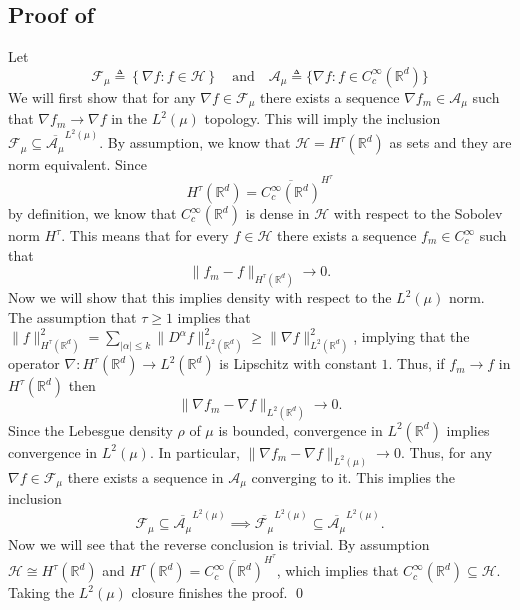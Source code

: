 \documentclass[11pt]{article}
\begin{document}
\subsection{Proof of } \label{sec: proof of suff cond for density}
Let 
\[\mathcal{F}_\mu \triangleq \left\{\nabla f : f \in \mathcal{H}\right\} \quad \text{and} \quad \mathcal{A}_\mu \triangleq \{\nabla f: f \in C^\infty_c(\mathbb{R}^d)\}\]
We will first show that for any $\nabla f \in \mathcal{F}_\mu$ there exists a sequence $\nabla f_m \in \mathcal{A}_\mu$ such that $\nabla f_m \rightarrow \nabla f$ in the $L^2(\mu)$ topology. This will imply the inclusion $\mathcal{F}_\mu \subseteq \overline{\mathcal{A}_\mu}^{L^2(\mu)}$.  By assumption, we know that $\mathcal{H} = H^\tau(\mathbb{R}^d)$ as sets and they are norm equivalent. Since
\[H^\tau(\mathbb{R}^d) = \overline{C_c^\infty(\mathbb{R}^d)}^{H^\tau}\]
by definition, we know that $C^\infty_c(\mathbb{R}^d)$ is dense in $\mathcal{H}$ with respect to the Sobolev norm $H^\tau$. This means that for every $f \in \mathcal{H}$ there exists a sequence $f_m \in C^{\infty}_c$ such that 
\[\|f_m - f\|_{H^{\tau}(\mathbb{R}^d)} \rightarrow 0.\]
Now we will show that this implies density with respect to the $L^2(\mu)$ norm. The assumption that $\tau \geq 1$ implies that $\|f\|_{H^{\tau}(\mathbb{R}^d)}^2 = \sum_{|\alpha| \leq k}\|D^\alpha f\|_{L^2(\mathbb{R}^d)}^2 \geq \|\nabla f\|_{L^2(\mathbb{R}^d)}^2$, implying that the operator $\nabla: H^\tau(\mathbb{R}^d) \rightarrow L^2(\mathbb{R}^d)$ is Lipschitz with constant $1$. Thus, if $f_m \rightarrow f$ in $H^\tau(\mathbb{R}^d)$ then
\[\|\nabla f_m - \nabla f\|_{L^2(\mathbb{R}^d)} \rightarrow 0.\]
Since the Lebesgue density $\rho$ of $\mu$ is bounded, convergence in $L^2(\mathbb{R}^d)$ implies convergence in $L^2(\mu)$. In particular, $\|\nabla f_m - \nabla f\|_{L^2(\mu)} \rightarrow 0$. Thus, for any $\nabla f \in \mathcal{F}_\mu$ there exists a sequence in $\mathcal{A}_\mu$ converging to it. This implies the inclusion 
\[\mathcal{F}_\mu \subseteq \overline{\mathcal{A}_\mu}^{L^2(\mu)} \implies \overline{\mathcal{F}_\mu}^{L^2(\mu)}\subseteq \overline{\mathcal{A}_\mu}^{L^2(\mu)}.\]
Now we will see that the reverse conclusion is trivial. By assumption $\mathcal{H} \cong H^\tau(\mathbb{R}^d)$  and $ H^\tau (\mathbb{R}^d) = \overline{C_c^\infty(\mathbb{R}^d)}^{H^\tau}$, which implies that $C^\infty_c(\mathbb{R}^d) \subseteq \mathcal{H}$. Taking the $L^2(\mu)$ closure finishes the proof.
\qed{}
\end{document}
